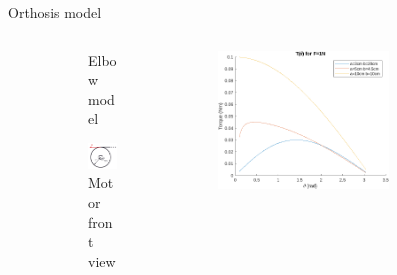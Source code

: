 \documentclass[aspectratio=169]{beamer}
\begin{document}
\begin{frame}{Orthosis model}
\begin{figure}[htbp]
\begin{columns}
\begin{column}{0.5\textwidth}
\begin{subfigure}{0.2\textwidth}
        \caption{Elbow model}
        \label{fig:elbow}
    \end{subfigure}
    \begin{subfigure}{0.3\textwidth}
        \centering
        \includegraphics[width=\linewidth]{motor_torque.png}
        \caption{Motor front view}
        \label{fig:motor}
    \end{subfigure}
    \caption{
      Simplified orthosis model
    }
    \label{fig:orthosis_model}
    \end{column}
    \begin{column}{0.5\textwidth}
    \begin{figure}[htbp]
	  \centering
	  \includegraphics[width=0.8\textwidth]{one_newton_torque.png}

\end{figure}
\end{column}
\end{columns}
\end{figure}
\end{frame}
\end{document}
